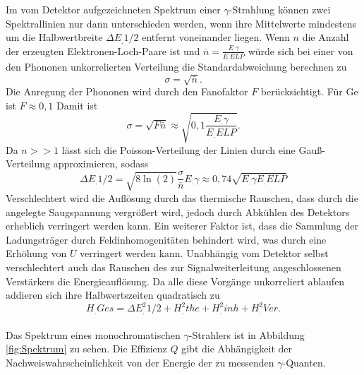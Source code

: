 Im vom Detektor aufgezeichneten Spektrum einer $\gamma$-Strahlung können zwei Spektrallinien nur dann unterschieden werden, wenn ihre Mittelwerte mindestens um die Halbwertbreite $\Delta E_.{1/2}$ entfernt voneinander liegen.
Wenn $n$ die Anzahl der erzeugten Elektronen-Loch-Paare ist und $\bar{n}=\frac{E_.{\gamma}}{E_.{ELP}}$ würde sich bei einer von den Phononen unkorrelierten Verteilung die Standardabweichung berechnen zu
\[
\sigma=\sqrt{\bar{n}}\text{.}
\]
Die Anregung der Phononen wird durch den Fanofaktor $F$ berücksichtigt. Für Ge ist $F\approx 0,1$
Damit ist 
\[
\sigma=\sqrt{F\bar{n}}\approx\sqrt{0,1\frac{E_.{\gamma}}{E_.{ELP}}}\text{.}\label{eq:sig}
\]
Da $n>>1$ lässt sich die Poisson-Verteilung der Linien durch eine Gauß-Verteilung approximieren, sodass
\begin{equation}
\Delta E_.{1/2}=\sqrt{8\ln(2)}\frac{\sigma}{\bar{n}}E_.{\gamma}\approx 0,74\sqrt{E_.{\gamma}E_.{ELP}}\label{eq:dE}
\end{equation}
Verschlechtert wird die Auflösung durch das thermische Rauschen, dass durch die angelegte Saugspannung vergrößert wird, jedoch durch Abkühlen des Detektors erheblich verringert werden kann. Ein weiterer Faktor ist, dass die Sammlung der Ladungsträger durch Feldinhomogenitäten behindert wird, was durch eine Erhöhung von $U$ verringert werden kann. Unabhängig vom Detektor selbst verschlechtert auch das Rauschen des zur Signalweiterleitung angeschlossenen Verstärkers die Energieauflösung. Da alle diese Vorgänge unkorreliert ablaufen addieren sich ihre Halbwertszeiten quadratisch zu
\begin{equation}
H_.{Ges}=\Delta E^2_.{1/2} + H^2_.{the} + H^2_.{inh} + H^2_.{Ver}\text{.}
\end{equation}
\\
Das Spektrum eines monochromatischen $\gamma$-Strahlers ist in Abbildung \ref{fig:Spektrum} zu sehen.
Die Effizienz $Q$ gibt die Abhängigkeit der Nachweiswahrscheinlichkeit von der Energie der zu messenden $\gamma$-Quanten.




